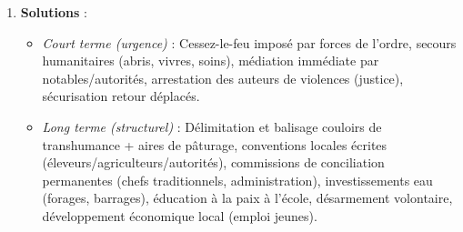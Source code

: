 \documentclass[11pt]{article}
\begin{document}
\begin{exoresolu}
\begin{enumerate}
\begin{itemize}
    \end{itemize}
    \item \textbf{Solutions} :
    \begin{itemize}
        \item \textit{Court terme (urgence)} : Cessez-le-feu imposé par forces de l'ordre, secours humanitaires (abris, vivres, soins), médiation immédiate par notables/autorités, arrestation des auteurs de violences (justice), sécurisation retour déplacés.
        \item \textit{Long terme (structurel)} : Délimitation et balisage couloirs de transhumance + aires de pâturage, conventions locales écrites (éleveurs/agriculteurs/autorités), commissions de conciliation permanentes (chefs traditionnels, administration), investissements eau (forages, barrages), éducation à la paix à l'école, désarmement volontaire, développement économique local (emploi jeunes).
    \end{itemize}
\end{enumerate}
\end{exoresolu}
\end{document}
